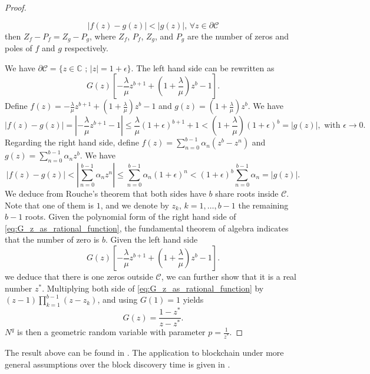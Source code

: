 \begin{proof}
\begin{lemma}
$$
|f(z)-g(z)|<|g(z)|\text{, }\forall z\in\partial\mathcal{C}
$$ 
then $Z_f-P_f = Z_g-P_g$, where $Z_f$, $P_f$, $Z_g$, and $P_g$ are the number of zeros and poles of $f$ and $g$ respectively.
\end{lemma}
We have $\partial\mathcal{C} =\{z\in\mathbb{C}\text{ ; }|z| =1+\epsilon\}$. The left hand side can be rewritten as
$$
G(z)\left[-\frac{\lambda}{\mu}z^{b+1} + \left(1 + \frac{\lambda}{\mu}\right)z^b -1\right].
$$
Define $f(z) = -\frac{\lambda}{\mu}z^{b+1} + \left(1 + \frac{\lambda}{\mu}\right)z^b -1$ and $g(z)=\left(1 + \frac{\lambda}{\mu}\right)z^b$. We have 
 $$
|f(z) - g(z)| = |-\frac{\lambda}{\mu}z^{b+1}-1|\leq \frac{\lambda}{\mu}(1+\epsilon)^{b+1}+1< \left(1 + \frac{\lambda}{\mu}\right)(1+\epsilon)^b= |g(z)| ,\text{ with }\epsilon \rightarrow 0. 
$$
Regarding the right hand side, define $f(z) = \sum_{n=0}^{b-1}\alpha_n(z^b - z^n)$ and $g(z) =\sum_{n=0}^{b-1}\alpha_nz^b $. We have 
$$
|f(z) - g(z)| < |\sum_{n=0}^{b-1}\alpha_n z^n| \leq \sum_{n=0}^{b-1}\alpha_n (1+\epsilon)^n<(1+\epsilon)^b\sum_{n=0}^{b-1}\alpha_n = |g(z)|.
$$
We deduce from Rouche's theorem that both sides have $b$ share roots inside $\mathcal{C}$. Note that one of them is $1$, and we denote by $z_k$, $k = 1,\ldots, b-1$ the remaining $b-1$ roots. Given the polynomial form of the right hand side of \eqref{eq:G_z_as_rational_function}, the fundamental theorem of algebra indicates that the number of zero is $b$. Given the left hand side 
$$
G(z)\left[-\frac{\lambda}{\mu}z^{b+1} + \left(1 + \frac{\lambda}{\mu}\right)z^b -1\right].
$$
we deduce that there is one zeros outside $\mathcal{C}$, we can further show that it is a real number $z^\ast$. Multiplying both side of \eqref{eq:G_z_as_rational_function} by $(z-1)\prod_{k =1}^{b-1}(z-z_k)$, and using $G(1)=1$ yields
$$
G(z) = \frac{1-z^\ast}{z-z^{\ast}}.
$$
$N^q$ is then a geometric random variable with parameter $p = \frac{1}{z^\ast}.$
\end{proof}
The result above can be found in \citet{Bailey1954}. The application to blockchain under more general assumptions over the block discovery time is given in \citet{Kawase2017}.
